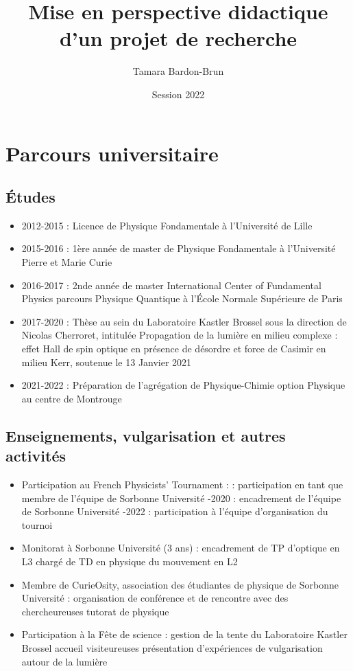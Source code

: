 \documentclass[a4paper,11pt]{article} %
\title{Mise en perspective didactique d'un projet de recherche}
\author{Tamara Bardon-Brun}
\date{Session 2022}
\newcommand{\pointmedian}{\fontfamily{cmr}\selectfont\textperiodcentered}
\begin{document}
	
	\maketitle
	
	\section{Parcours universitaire}
	\subsection{\'{E}tudes}
	\begin{itemize}
		\item 2012-2015 : Licence de Physique Fondamentale à l'Université de Lille
		\item 2015-2016 : 1ère année de master de Physique Fondamentale à l'Université Pierre et Marie Curie
		\item 2016-2017 : 2nde année de master International Center of Fundamental Physics parcours Physique Quantique à l'\'{E}cole Normale Supérieure de Paris
		\item 2017-2020 : Thèse au sein du Laboratoire Kastler Brossel sous la direction de Nicolas Cherroret, intitulée \og Propagation de la lumière en milieu complexe : effet Hall de spin optique en présence de désordre et force de Casimir en milieu Kerr\fg{}, soutenue le 13 Janvier 2021
		\item 2021-2022 : Préparation de l'agrégation de Physique-Chimie option Physique au centre de Montrouge
	\end{itemize}
	
	\subsection{Enseignements, vulgarisation et autres activités}
	\begin{itemize}
		\item Participation au French Physicists' Tournament :
		 : participation en tant que membre de l'équipe de Sorbonne Université
		-2020 : encadrement de l'équipe de Sorbonne Université
		-2022 : participation à l'équipe d'organisation du tournoi \\
		\item Monitorat à Sorbonne Université (3 ans) :
		\subitem encadrement de TP d'optique en L3
		\subitem chargé de TD en physique du mouvement en L2 \\
		\item Membre de CurieOsity, association des étudiant\pointmedian es de physique de Sorbonne Université :
		\subitem organisation de conférence et de rencontre avec des chercheur\pointmedian euses
		\subitem tutorat de physique\\
		\item Participation à la Fête de science :
		\subitem gestion de la tente du Laboratoire Kastler Brossel
		\subitem accueil visiteur\pointmedian euses 
		\subitem présentation d'expériences de vulgarisation autour de la lumière
	\end{itemize}
\end{document}
